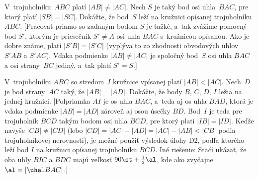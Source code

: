{V~trojuholníku~$ABC$ platí $|AB|\ne|AC|$.
Nech $S$ je taký bod osi uhla~$BAC$, pre
ktorý platí $|SB|=|SC|$. Dokážte, že bod~$S$ leží na kružnici
opísanej trojuholníku $ABC$.
[Pracovať priamo so zadaným bodom $S$ je ťažké, a~tak zvážime
pomocný bod $S'$, ktorým je priesečník $S'\ne A$ osi uhla $BAC$ s~kružnicou
opísanou. Ako je dobre známe, platí $|S'B|=|S'C|$ (vyplýva to zo
zhodnosti obvodových uhlov $S'AB$ a $S'AC$). Vďaka podmienke
$|AB|\ne|AC|$ je spoločný bod~$S$ osi uhla $BAC$ a osi strany~$BC$
jediný, a~tak platí $S'=S$.]

V~trojuholníku $ABC$ so stredom~$I$ kružnice vpísanej platí
$|AB|<|AC|$. Nech~$D$ je bod strany~$AC$ taký,
že $|AB|=|AD|$. Dokážte, že body $B$, $C$, $D$, $I$ ležia na
jednej kružnici.
[Polpriamka $AI$ je os uhla $BAC$, a~teda aj os uhla $BAD$,
ktorá je vďaka podmienke $|AB|=|AD|$ zároveň aj osou úsečky $BD$.
Bod~$I$ je teda pre trojuholník $BCD$ takým bodom osi uhla $BCD$, pre
ktorý platí $|IB|=|ID|$. Keďže navyše $|CB|\ne|CD|$ (lebo
$|CD|=|AC|-|AD|=|AC|-|AB|<|CB|$ podľa trojuholníkovej nerovnosti),
je možné použiť výsledok úlohy D2, podľa ktorého leží
bod $I$ na kružnici opísanej trojuholníku $BCD$. Iné riešenie: Stačí ukázať,
že oba uhly $BIC$ a $BDC$ majú veľkosť $90\st+\frac12\al$, kde ako zvyčajne $\al=|\uhel BAC|$.]
}

